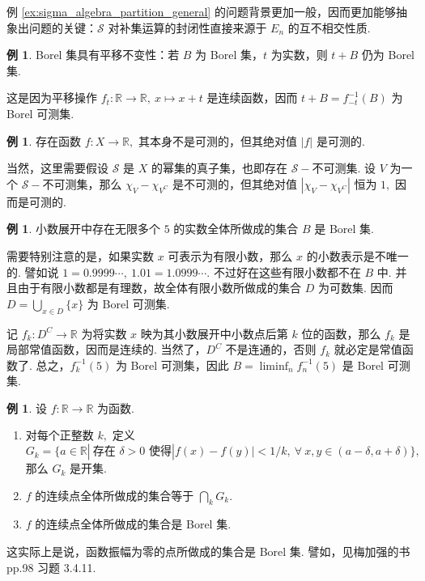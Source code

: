 \documentclass[12pt, a4paper, oneside]{book}
\numberwithin{figure}{section}
\theoremstyle{definition}
\newtheorem{example}[theorem]{例}
\begin{document}
例 \ref{ex:sigma_algebra_partition_general} 的问题背景更加一般，因而更加能够抽象出问题的关键：$\mathcal S$ 对补集运算的封闭性直接来源于 $E_n$ 的互不相交性质.



\begin{example}
    Borel 集具有平移不变性：若 $B$ 为 Borel 集，$t$ 为实数，则 $t+B$ 仍为 Borel 集.
\end{example}
这是因为平移操作 $f_t:\mathbb R\to\mathbb R,\ x\mapsto x+t$ 是连续函数，因而 $t+B= f_{-t}^{-1}(B)$ 为 Borel 可测集. 

\begin{example}
    存在函数 $f:X\to\mathbb R,$ 其本身不是可测的，但其绝对值 $|f|$ 是可测的.
\end{example}
当然，这里需要假设 $\mathcal S$ 是 $X$ 的幂集的真子集，也即存在 $\mathcal S-$不可测集. 设 $V$ 为一个 $\mathcal S-$不可测集，那么 $\chi_V-\chi_{V^C}$ 是不可测的，但其绝对值 $|\chi_V-\chi_{V^C}|$ 恒为 $1,$ 因而是可测的.

\begin{example}
    小数展开中存在无限多个 $5$ 的实数全体所做成的集合 $B$ 是 Borel 集.
\end{example}
需要特别注意的是，如果实数 $x$ 可表示为有限小数，那么 $x$ 的小数表示是不唯一的. 譬如说 $1=0.9999\cdots,\ 1.01=1.0999\cdots.$ 
不过好在这些有限小数都不在 $B$ 中. 并且由于有限小数都是有理数，故全体有限小数所做成的集合 $D$ 为可数集. 因而 $D=\bigcup_{x\in D}\{x\}$ 为 Borel 可测集.

记 $f_k:D^C\to \mathbb R$ 为将实数 $x$ 映为其小数展开中小数点后第 $k$ 位的函数，那么 $f_k$ 是局部常值函数，因而是连续的. 当然了，$D^C$ 不是连通的，否则 $f_k$ 就必定是常值函数了.
总之，$f_k^{-1}(5)$ 为 Borel 可测集，因此 $B=\liminf_n f_n^{-1}(5)$ 是 Borel 可测集. 

\begin{example}\label{ex:continuous_point_set_is_Borel_measurable}
    设 $f:\mathbb R\to\mathbb R$ 为函数.
    \begin{enumerate}[label=\alph*)]
        \item 对每个正整数 $k,$ 定义 $G_k=\{a\in\mathbb R|\ \text{存在 $\delta>0$ 使得} |f(x)-f(y)|<1/k,\ \forall\ x,y\in (a-\delta,a+\delta) \},$ 那么 $G_k$ 是开集.
        \item $f$ 的连续点全体所做成的集合等于 $\bigcap_k G_k.$ 
        \item $f$ 的连续点全体所做成的集合是 Borel 集.
    \end{enumerate}
\end{example}
这实际上是说，函数振幅为零的点所做成的集合是 Borel 集. 譬如，见梅加强的书 \cite{Mei_2011} pp.98 习题 3.4.11.
\end{document}

